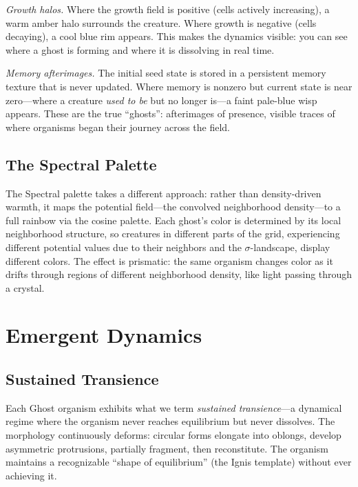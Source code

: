 \documentclass[11pt,a4paper]{article}
\begin{document}
\textit{Growth halos.} Where the growth field is positive (cells actively
increasing), a warm amber halo surrounds the creature. Where growth is
negative (cells decaying), a cool blue rim appears. This makes the dynamics
visible: you can see where a ghost is forming and where it is dissolving in
real time.

\textit{Memory afterimages.} The initial seed state is stored in a
persistent memory texture that is never updated. Where memory is nonzero
but current state is near zero---where a creature \emph{used to be} but no
longer is---a faint pale-blue wisp appears. These are the true ``ghosts'':
afterimages of presence, visible traces of where organisms began their
journey across the field.

\subsection{The Spectral Palette}

The Spectral palette takes a different approach: rather than density-driven
warmth, it maps the potential field---the convolved neighborhood
density---to a full rainbow via the cosine palette. Each ghost's color is
determined by its local neighborhood structure, so creatures in different
parts of the grid, experiencing different potential values due to their
neighbors and the $\sigma$-landscape, display different colors. The effect
is prismatic: the same organism changes color as it drifts through regions
of different neighborhood density, like light passing through a crystal.

\section{Emergent Dynamics}

\subsection{Sustained Transience}

Each Ghost organism exhibits what we term \emph{sustained transience}---a
dynamical regime where the organism never reaches equilibrium but never
dissolves. The morphology continuously deforms: circular forms elongate
into oblongs, develop asymmetric protrusions, partially fragment, then
reconstitute. The organism maintains a recognizable ``shape of
equilibrium'' (the Ignis template) without ever achieving it.
\end{document}
